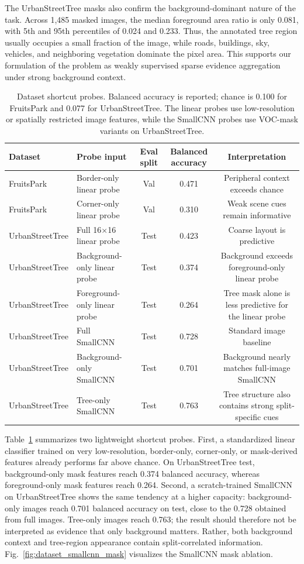 \documentclass{ieeeaccess}
\begin{document}
The UrbanStreetTree masks also confirm the background-dominant nature of the task. Across 1,485
masked images, the median foreground area ratio is only 0.081, with 5th and 95th percentiles of
0.024 and 0.233. Thus, the annotated tree region usually occupies a small fraction of the image,
while roads, buildings, sky, vehicles, and neighboring vegetation dominate the pixel area. This
supports our formulation of the problem as weakly supervised sparse evidence aggregation under
strong background context.

\begin{table}[!t]
\centering
\caption{Dataset shortcut probes. Balanced accuracy is reported; chance is 0.100 for FruitsPark and
         0.077 for UrbanStreetTree. The linear probes use low-resolution or spatially restricted
         image features, while the SmallCNN probes use VOC-mask variants on UrbanStreetTree.}
\label{tab:dataset_shortcut_probes}
\scriptsize
\begin{tabular}{llccc}
\toprule
Dataset & Probe input & Eval split & Balanced accuracy & Interpretation \\
\midrule
FruitsPark & Border-only linear probe & Val & 0.471 & Peripheral context exceeds chance \\
FruitsPark & Corner-only linear probe & Val & 0.310 & Weak scene cues remain informative \\
UrbanStreetTree & Full 16$\times$16 linear probe & Test & 0.423 & Coarse layout is predictive \\
UrbanStreetTree & Background-only linear probe & Test & 0.374 & Background exceeds foreground-only linear probe \\
UrbanStreetTree & Foreground-only linear probe & Test & 0.264 & Tree mask alone is less predictive for the linear probe \\
UrbanStreetTree & Full SmallCNN & Test & 0.728 & Standard image baseline \\
UrbanStreetTree & Background-only SmallCNN & Test & 0.701 & Background nearly matches full-image SmallCNN \\
UrbanStreetTree & Tree-only SmallCNN & Test & 0.763 & Tree structure also contains strong split-specific cues \\
\bottomrule
\end{tabular}
\end{table}

Table~\ref{tab:dataset_shortcut_probes} summarizes two lightweight shortcut probes. First, a
standardized linear classifier trained on very low-resolution, border-only, corner-only, or
mask-derived features already performs far above chance. On UrbanStreetTree test, background-only
mask features reach 0.374 balanced accuracy, whereas foreground-only mask features reach 0.264.
Second, a scratch-trained SmallCNN on UrbanStreetTree shows the same tendency at a higher capacity:
background-only images reach 0.701 balanced accuracy on test, close to the 0.728 obtained from full
images. Tree-only images reach 0.763; the result should therefore not be interpreted as evidence
that only background matters. Rather, both background context and tree-region appearance contain
split-correlated information. Fig.~\ref{fig:dataset_smallcnn_mask} visualizes the SmallCNN mask
ablation.
\end{document}
